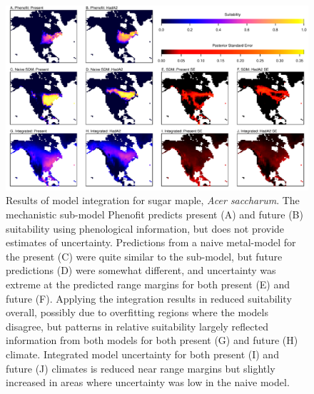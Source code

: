 \begin{figure}[tb]
	\includegraphics[width=6in]{ex2.pdf}
	\caption{Results of model integration for sugar maple, \emph{Acer saccharum}.
	The mechanistic sub-model Phenofit predicts present (A) and future (B) suitability using phenological information, but does not provide estimates of uncertainty.
	Predictions from a naive metal-model for the present (C) were quite similar to the sub-model, but future predictions (D) were somewhat different, and uncertainty was extreme at the predicted range margins for both present (E) and future (F).
	Applying the integration results in reduced suitability overall, possibly due to overfitting regions where the models disagree, but patterns in relative suitability largely reflected information from both models for both present (G) and future (H) climate.
	Integrated model uncertainty for both present (I) and future (J) climates is reduced near range margins but slightly increased in areas where uncertainty was low in the naive model.
	}
	\label{fig:ex2}
\end{figure}
%

